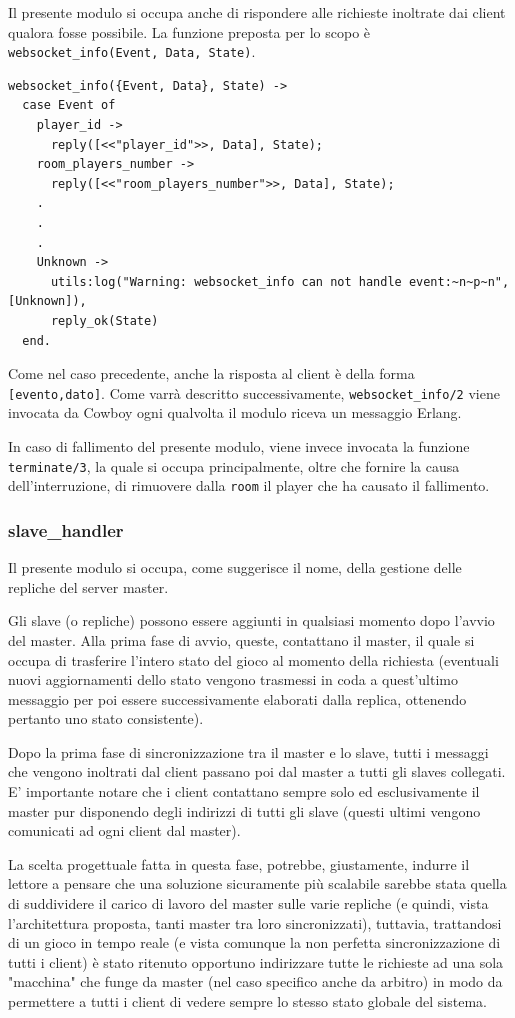 \documentclass[paper=a4, fontsize=11pt]{scrartcl} %
\numberwithin{equation}{section} %
\numberwithin{figure}{section} %
\numberwithin{table}{section} %
\begin{document}
Il presente modulo si occupa anche di rispondere alle richieste inoltrate dai client qualora fosse possibile. La funzione preposta per lo scopo è \texttt{websocket\_info({Event, Data}, State)}.
\begin{lstlisting}[basicstyle=\footnotesize]
websocket_info({Event, Data}, State) ->
  case Event of
    player_id ->
      reply([<<"player_id">>, Data], State);
    room_players_number ->
      reply([<<"room_players_number">>, Data], State);
    .
    .
    .
    Unknown ->
      utils:log("Warning: websocket_info can not handle event:~n~p~n", [Unknown]),
      reply_ok(State)
  end.
\end{lstlisting}
Come nel caso precedente, anche la risposta al client è della forma \texttt{[evento,dato]}. Come varrà descritto successivamente, \texttt{websocket\_info/2} viene invocata da Cowboy ogni qualvolta il modulo riceva un messaggio Erlang.

In caso di fallimento del presente modulo, viene invece invocata la funzione \texttt{terminate/3}, la quale si occupa principalmente, oltre che fornire la causa dell'interruzione, di rimuovere dalla \texttt{room} il player che ha causato il fallimento.
\subsubsection{slave\_handler}
Il presente modulo si occupa, come suggerisce il nome, della gestione delle repliche del server master.

Gli slave (o repliche) possono essere aggiunti in qualsiasi momento dopo l'avvio del master.
Alla prima fase di avvio, queste, contattano il master, il quale si occupa di trasferire l'intero stato del gioco al momento della richiesta (eventuali nuovi aggiornamenti dello stato vengono trasmessi in coda a quest'ultimo messaggio per poi essere successivamente elaborati dalla replica, ottenendo pertanto uno stato consistente).

Dopo la prima fase di sincronizzazione tra il master e lo slave, tutti i messaggi che vengono inoltrati dal client passano poi dal master a tutti gli slaves collegati. E' importante notare che i client contattano sempre solo ed esclusivamente il master pur disponendo degli indirizzi di tutti gli slave (questi ultimi vengono comunicati ad ogni client dal master).

La scelta progettuale fatta in questa fase, potrebbe, giustamente, indurre il lettore a pensare che una soluzione sicuramente più scalabile sarebbe stata quella di suddividere il carico di lavoro del master sulle varie repliche (e quindi, vista l'architettura proposta, tanti master tra loro sincronizzati), tuttavia, trattandosi di un gioco in tempo reale (e vista comunque la non perfetta sincronizzazione di tutti i client) è stato ritenuto opportuno indirizzare tutte le richieste ad una sola "macchina" che funge da master (nel caso specifico anche da arbitro) in modo da permettere a tutti i client di vedere sempre lo stesso stato globale del sistema.
\end{document}
